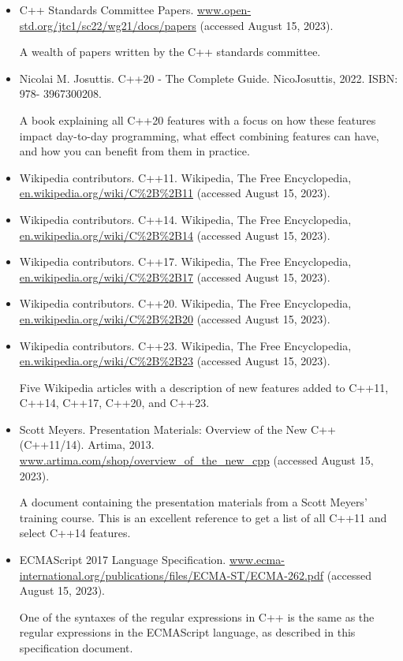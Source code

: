 \begin{itemize}
\item
C++ Standards Committee Papers. \url{www.open-std.org/jtc1/sc22/wg21/docs/papers} (accessed August 15, 2023).

A wealth of papers written by the C++ standards committee.

\item
Nicolai M. Josuttis. C++20 - The Complete Guide. NicoJosuttis, 2022. ISBN: 978- 3967300208.

A book explaining all C++20 features with a focus on how these features impact day-to-day programming, what effect combining features can have, and how you can benefit from them in practice.

\item
Wikipedia contributors. C++11. Wikipedia, The Free Encyclopedia, \url{en.wikipedia.org/wiki/C%2B%2B11} (accessed August 15, 2023).

\item
Wikipedia contributors. C++14. Wikipedia, The Free Encyclopedia, \url{en.wikipedia.org/wiki/C%2B%2B14} (accessed August 15, 2023).

\item
Wikipedia contributors. C++17. Wikipedia, The Free Encyclopedia, \url{en.wikipedia.org/wiki/C%2B%2B17} (accessed August 15, 2023).

\item
Wikipedia contributors. C++20. Wikipedia, The Free Encyclopedia, \url{en.wikipedia.org/wiki/C%2B%2B20} (accessed August 15, 2023).

\item
Wikipedia contributors. C++23. Wikipedia, The Free Encyclopedia, \url{en.wikipedia.org/wiki/C%2B%2B23} (accessed August 15, 2023).

Five Wikipedia articles with a description of new features added to C++11, C++14, C++17, C++20, and C++23.

\item
Scott Meyers. Presentation Materials: Overview of the New C++ (C++11/14). Artima, 2013. \url{www.artima.com/shop/overview_of_the_new_cpp} (accessed August 15, 2023).

A document containing the presentation materials from a Scott Meyers’ training course. This is an excellent reference to get a list of all C++11 and select C++14 features.

\item
ECMAScript 2017 Language Specification. \url{www.ecma-international.org/publications/files/ECMA-ST/ECMA-262.pdf} (accessed August 15, 2023).

One of the syntaxes of the regular expressions in C++ is the same as the regular expressions in the ECMAScript language, as described in this specification document.
\end{itemize}













